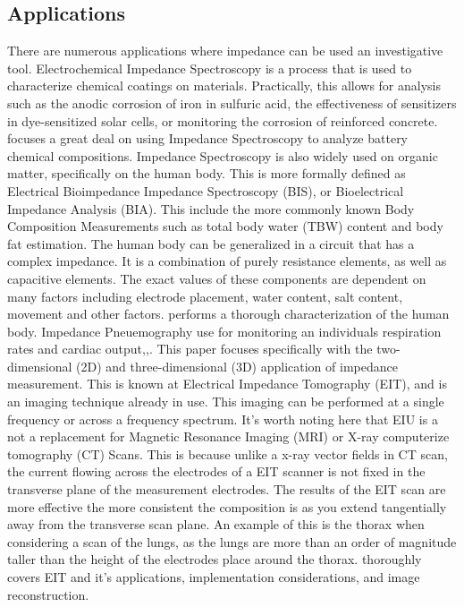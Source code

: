 \documentclass[]{IEEEtran}
\begin{document}
\subsection{Applications}
There are numerous applications where impedance can be used an investigative tool. Electrochemical Impedance Spectroscopy is a process that is used to characterize chemical coatings on materials\cite{macdonald_reflections_2006}. Practically, this allows for analysis such as the anodic corrosion of iron in sulfuric acid, the effectiveness of sensitizers in dye-sensitized solar cells\cite{wang_electrochemical_2005}, or monitoring the corrosion of reinforced concrete\cite{ribeiro_use_2015}. \cite{barsoukov_impedance_2005} focuses a great deal on using Impedance Spectroscopy to analyze battery chemical compositions. Impedance Spectroscopy is also widely used on organic matter, specifically on the human body. This is more formally defined as Electrical Bioimpedance Impedance Spectroscopy (BIS), or Bioelectrical Impedance Analysis (BIA). This include the more commonly known Body Composition Measurements such as total body water (TBW) content and body fat estimation. The human body can be generalized in a circuit that has a complex impedance. It is a combination of purely resistance elements, as well as capacitive elements. The exact values of these components are dependent on many factors including electrode placement, water content, salt content, movement and other factors.\cite{lukaski_assessment_1985} performs a thorough characterization of the human body. Impedance Pneuemography use for monitoring an individuals respiration rates and cardiac output\cite{grenvik_impedance_1972},\cite{larsen_impedance_1984},\cite{ernst_impedance_1999}.
\newline
This paper focuses specifically with the two-dimensional (2D) and three-dimensional (3D) application of impedance measurement. This is known at Electrical Impedance Tomography (EIT), and is an imaging technique already in use. This imaging can be performed at a single frequency or across a frequency spectrum. It's worth noting here that EIU is a not a replacement for Magnetic Resonance Imaging (MRI) or X-ray computerize tomography (CT) Scans. This is because unlike a x-ray vector fields in CT scan, the current flowing across the electrodes of a EIT scanner is not fixed in the transverse plane of the measurement electrodes. The results of the EIT scan are more effective the more consistent the composition is as you extend tangentially away from the transverse scan plane. An example of this is the thorax when considering a scan of the lungs, as the lungs are more than an order of magnitude taller than the height of the electrodes place around the thorax. \cite{adler_electrical_2017} thoroughly covers EIT and it's applications, implementation considerations, and image reconstruction. 
\end{document}
